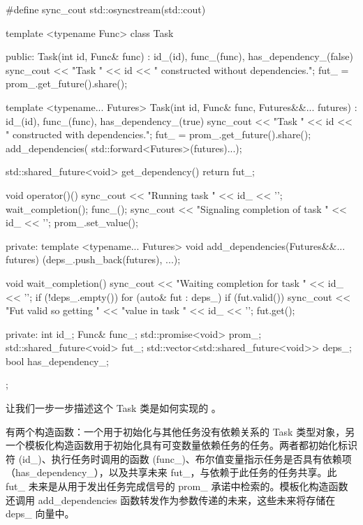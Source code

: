 \begin{cpp}
#define sync_cout std::osyncstream(std::cout)

template <typename Func>
class Task {
    public:
    Task(int id, Func& func)
        : id_(id), func_(func), has_dependency_(false) {
        sync_cout << "Task " << id
        << " constructed without dependencies.\n";
        fut_ = prom_.get_future().share();
    }

    template <typename... Futures>
    Task(int id, Func& func, Futures&&... futures)
        : id_(id), func_(func), has_dependency_(true) {
        sync_cout << "Task " << id
        << " constructed with dependencies.\n";
        fut_ = prom_.get_future().share();
        add_dependencies(
        std::forward<Futures>(futures)...);
    }

    std::shared_future<void> get_dependency() {
        return fut_;
    }

    void operator()() {
        sync_cout << "Running task " << id_ << '\n';
        wait_completion();
        func_();
        sync_cout << "Signaling completion of task "
                  << id_ << '\n';
        prom_.set_value();
    }

private:
    template <typename... Futures>
    void add_dependencies(Futures&&... futures) {
        (deps_.push_back(futures), ...);
    }

    void wait_completion() {
        sync_cout << "Waiting completion for task "
        << id_ << '\n';
        if (!deps_.empty()) {
            for (auto& fut : deps_) {
                if (fut.valid()) {
                    sync_cout << "Fut valid so getting "
                              << "value in task "
                              << id_ << '\n';
                    fut.get();
                }
            }
        }
    }

private:
    int id_;
    Func& func_;
    std::promise<void> prom_;
    std::shared_future<void> fut_;
    std::vector<std::shared_future<void>> deps_;
    bool has_dependency_;
};
\end{cpp}

让我们一步一步描述这个 Task 类是如何实现的 。

有两个构造函数：一个用于初始化与其他任务没有依赖关系的 Task 类型对象，另一个模板化构造函数用于初始化具有可变数量依赖任务的任务。两者都初始化标识符 (id\_)、执行任务时调用的函数 (func\_)、布尔值变量指示任务是否具有依赖项（has\_dependency\_），以及共享未来 fut\_，与依赖于此任务的任务共享。此 fut\_ 未来是从用于发出任务完成信号的 prom\_ 承诺中检索的。模板化构造函数还调用 add\_dependencies 函数转发作为参数传递的未来，这些未来将存储在 deps\_ 向量中。

